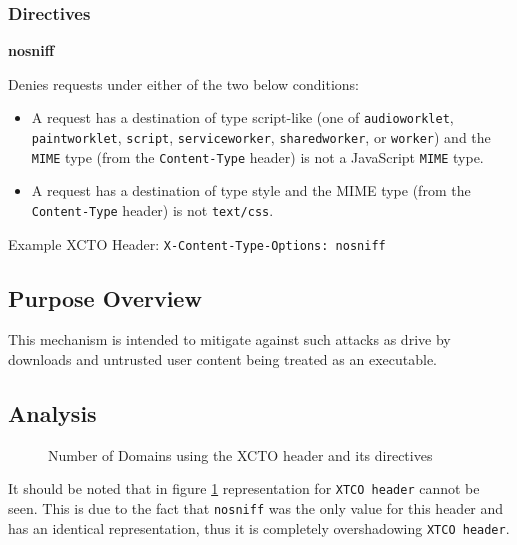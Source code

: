 \documentclass{mscreport}
\begin{document}
\subsubsection{Directives}

\textbf{nosniff}

\vspace{0.3cm} \noindent
Denies requests under either of the two below conditions:

\begin{itemize}
  \setlength\itemsep{0.1em}
  \item A request has a destination of type script-like (one of \texttt{audioworklet}, \texttt{paintworklet}, \texttt{script}, \texttt{serviceworker}, \texttt{sharedworker}, or \texttt{worker}) and the \texttt{MIME} type (from the \texttt{Content-Type} header) is not a JavaScript \texttt{MIME} type.
  \item A request has a destination of type style and the MIME type (from the \texttt{Content-Type} header) is not \texttt{text/css}.
\end{itemize}

\vspace{0.3cm} \noindent
Example XCTO Header: \texttt{X-Content-Type-Options: nosniff}

\subsection{Purpose Overview}

\noindent
This mechanism is intended to mitigate against such attacks as drive by downloads and untrusted user content being treated as an executable.

\newpage

\subsection{Analysis}

\begin{figure}[t]
	\begin{center}
		\caption{Number of Domains using the XCTO header and its directives}
		\label{fig:xcto_overview}
	\end{center}
\end{figure}

\noindent
It should be noted that in figure \ref{fig:xcto_overview} representation for \texttt{XTCO header} cannot be seen. This is due to the fact that \texttt{nosniff} was the only value for this header and has an identical representation, thus it is completely overshadowing \texttt{XTCO header}.
\end{document}
